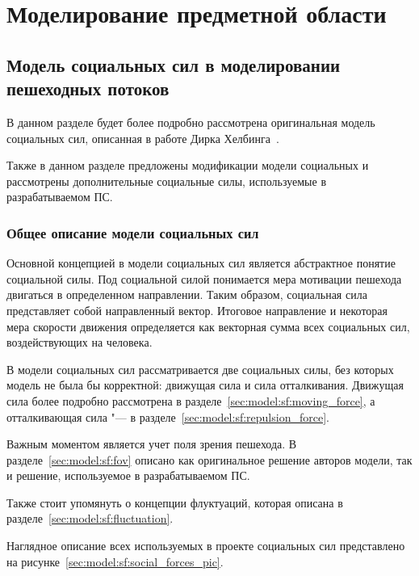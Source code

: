 \section{Моделирование предметной области}
\label{sec:model}

\subsection{Модель социальных сил в моделировании пешеходных потоков}
\label{sec:model:sf}

В данном разделе будет более подробно рассмотрена оригинальная модель социальных сил, описанная в работе Дирка Хелбинга~\cite{helbing_social_force}.

Также в данном разделе предложены модификации модели социальных и рассмотрены дополнительные социальные силы, используемые в разрабатываемом ПС.

\subsubsection{Общее описание модели социальных сил}
\label{sec:model:sf:description}

Основной концепцией в модели социальных сил является абстрактное понятие социальной силы.
Под социальной силой понимается мера мотивации пешехода двигаться в определенном направлении.
Таким образом, социальная сила представляет собой направленный вектор.
Итоговое направление и некоторая мера скорости движения определяется как векторная сумма всех социальных сил, воздействующих на человека.

В модели социальных сил рассматривается две социальных силы, без которых модель не была бы корректной: движущая сила и сила отталкивания.
Движущая сила более подробно рассмотрена в разделе~\ref{sec:model:sf:moving_force}, а отталкивающая сила "--- в разделе~\ref{sec:model:sf:repulsion_force}.

Важным моментом является учет поля зрения пешехода. В разделе~\ref{sec:model:sf:fov} описано как оригинальное решение авторов модели, так и решение, используемое в разрабатываемом ПС.

Также стоит упомянуть о концепции флуктуаций, которая описана в разделе~\ref{sec:model:sf:fluctuation}.


Наглядное описание всех используемых в проекте социальных сил представлено на рисунке~\ref{sec:model:sf:social_forces_pic}.

